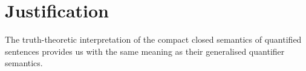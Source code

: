 \section{Justification}
\label{just}




\begin{proposition}
The truth-theoretic interpretation of the compact closed semantics of quantified sentences provides us with the same meaning as their generalised quantifier semantics.
\end{proposition}


